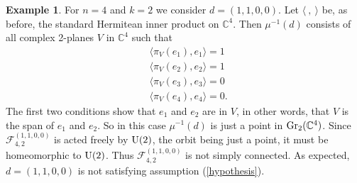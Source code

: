 \documentclass[12pt]{amsart}
\theoremstyle{definition}
\newtheorem{ex}[thm]{Example}
\theoremstyle{remark}
\newcommand{\RR}{\mathbb R}
\newcommand{\CC}{\mathbb C}
\begin{document}


\begin{ex} \label{exa} For $n=4$ and $k=2$ we consider $d=(1,1,0,0)$. Let $\langle \ ,  \ \rangle$ be, as before, the standard Hermitean inner product on $\CC^4$.  Then $\mu^{-1}(d)$ consists of all complex
2-planes $V$ in $\CC^4$ such that
\begin{align*}
{}& \langle \pi_V(e_1), e_1 \rangle =1\\
 {}& \langle \pi_V(e_2), e_2 \rangle =1\\
 {}& \langle \pi_V(e_3), e_3 \rangle =0\\
 {}& \langle \pi_V(e_4), e_4 \rangle =0.
 \end{align*}
The first two conditions show that $e_1$ and $e_2$ are in $V$, in other words,  that $V$ is the span of $e_1$ and $e_2$.
So in this case $\mu^{-1}(d)$ is just a point in ${\rm Gr}_2(\CC^4)$. 
  Since ${\mathcal F}_{4, 2}^{(1,1,0,0)}$ is acted freely by ${\rm U}(2)$, the orbit being just a point, it must be homeomorphic to
  ${\rm U}(2)$. 
  Thus $ {\mathcal F}_{4, 2}^{(1,1,0,0)}$ is not simply connected. As expected,  $d=(1,1,0,0)$ is  not satisfying assumption (\ref{hypothesis}).\end{ex}
\end{document}
